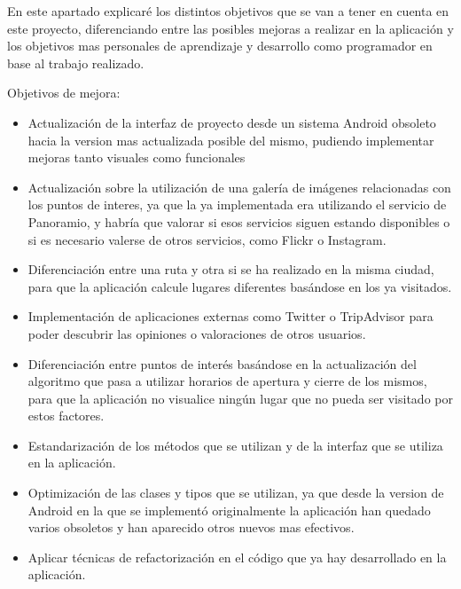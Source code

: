 
En este apartado explicaré los distintos objetivos que se van a tener en cuenta en este proyecto, diferenciando entre las posibles mejoras a realizar en la aplicación y los objetivos mas personales de aprendizaje y desarrollo como programador en base al trabajo realizado.

Objetivos de mejora:
\begin{itemize}
\item Actualización de la interfaz de proyecto desde un sistema Android obsoleto hacia la version mas actualizada posible del mismo, pudiendo implementar mejoras tanto visuales como funcionales
\item Actualización sobre la utilización de una galería de imágenes relacionadas con los puntos de interes, ya que la ya implementada era utilizando el servicio de Panoramio, y habría que valorar si esos servicios siguen estando disponibles o si es necesario valerse de otros servicios, como Flickr o Instagram.
\item Diferenciación entre una ruta y otra si se ha realizado en la misma ciudad, para que la aplicación calcule lugares diferentes basándose en los ya visitados.
\item Implementación de aplicaciones externas como Twitter o TripAdvisor para poder descubrir las opiniones o valoraciones de otros usuarios.
\item Diferenciación entre puntos de interés basándose en la actualización del algoritmo que pasa a utilizar horarios de apertura y cierre de los mismos, para que la aplicación no visualice ningún lugar que no pueda ser visitado por estos factores.
\item Estandarización de los métodos que se utilizan y de la interfaz que se utiliza en la aplicación.
\item Optimización de las clases y tipos que se utilizan, ya que desde la version de Android en la que se implementó originalmente la aplicación han quedado varios obsoletos y han aparecido otros nuevos mas efectivos.
\item Aplicar técnicas de refactorización en el código que ya hay desarrollado en la aplicación.
\end{itemize}

